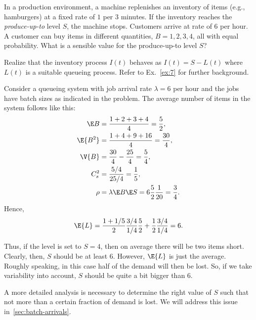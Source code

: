 \begin{exercise}
 In a production environment, a machine replenishes an inventory of items (e.g., hamburgers) at a fixed rate of $1$ per 3 minutes.
 If the inventory reaches the \emph{produce-up-to} level $S$, the machine stops.
 Customers arrive at rate of 6 per hour.
 A customer can buy items in different quantities, $B=1,2,3,4$, all with equal probability.
 What is a sensible value for the produce-up-to level $S$?
\begin{hint}
Realize that the inventory process $I(t)$ behaves as $I(t)=S-L(t)$ where $L(t)$ is a suitable queueing process. Refer to Ex.~\cref{ex:7} for further background.
\end{hint}
\begin{solution}
Consider a queueing system with job
arrival rate $\lambda=6$ per hour and the jobs have batch sizes as
indicated in the problem. The average number of items in the system
follows like this:
 \begin{align*}
 \E B &= \frac{1+2+3+4}{4} = \frac 52, \\
 \E{B^2} &= \frac{1+4+9+16}{4} = \frac{30}4,\\
 \V{B} &= \frac{30}4 - \frac{25}4 = \frac 5 4,\\
 C_s^2 &= \frac{5/4}{25/4} = \frac 15,\\
 \rho &= \lambda \E B \E S = 6 \frac 52 \frac 1{20} = \frac 34.
 \end{align*}
Hence, 
\begin{equation*}
 \E{L} = \frac {1+1/5}2 \frac{3/4}{1/4} \frac 52 + \frac 12 \frac{3/4}{1/4} = 6.
\end{equation*}

Thus, if the level is set to $S=4$, then on average there will be two
items short. Clearly, then, $S$ should be at least $6$. However,
$\E{L}$ is just the average. Roughly speaking, in this case half of
the demand will then be lost. So, if we take variability into account,
$S$ should be quite a bit bigger than 6. 

A more detailed analysis is
necessary to determine the right value of $S$ such that not more than
a certain fraction of demand is lost. We will address this issue in~\cref{sec:batch-arrivals}.
\end{solution}
\end{exercise}

